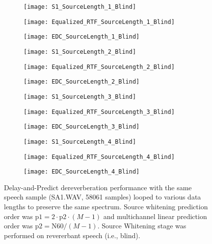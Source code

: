 \begin{figure}[H]
	\centering
	\begin{subfigure}[b]{0.3\textwidth}
		\centering
		\texttt{[image: S1\_SourceLength\_1\_Blind]}
	\end{subfigure}
	\begin{subfigure}[b]{0.3\textwidth}
		\centering
		\texttt{[image: Equalized\_RTF\_SourceLength\_1\_Blind]}
	\end{subfigure}
	\begin{subfigure}[b]{0.3\textwidth}
		\centering
		\texttt{[image: EDC\_SourceLength\_1\_Blind]}
	\end{subfigure}
	\begin{subfigure}[b]{0.3\textwidth}
		\centering
		\texttt{[image: S1\_SourceLength\_2\_Blind]}
	\end{subfigure}
	\begin{subfigure}[b]{0.3\textwidth}
		\centering
		\texttt{[image: Equalized\_RTF\_SourceLength\_2\_Blind]}
	\end{subfigure}
	\begin{subfigure}[b]{0.3\textwidth}
		\centering
		\texttt{[image: EDC\_SourceLength\_2\_Blind]}
	\end{subfigure}
	\begin{subfigure}[b]{0.3\textwidth}
		\centering
		\texttt{[image: S1\_SourceLength\_3\_Blind]}
	\end{subfigure}
	\begin{subfigure}[b]{0.3\textwidth}
		\centering
		\texttt{[image: Equalized\_RTF\_SourceLength\_3\_Blind]}
	\end{subfigure}
	\begin{subfigure}[b]{0.3\textwidth}
		\centering
		\texttt{[image: EDC\_SourceLength\_3\_Blind]}
	\end{subfigure}
	\begin{subfigure}[b]{0.3\textwidth}
		\centering
		\texttt{[image: S1\_SourceLength\_4\_Blind]}
	\end{subfigure}
	\begin{subfigure}[b]{0.3\textwidth}
		\centering
		\texttt{[image: Equalized\_RTF\_SourceLength\_4\_Blind]}
	\end{subfigure}
	\begin{subfigure}[b]{0.3\textwidth}
		\centering
		\texttt{[image: EDC\_SourceLength\_4\_Blind]}
	\end{subfigure}
	\caption{Delay-and-Predict dereverberation performance with the same speech sample (SA1.WAV, 58061 samples) looped to various data lengths to preserve the same spectrum. Source whitening prediction order was $\mathrm{p1} = 2 \cdot \mathrm{p2} \cdot (M-1)$ and multichannel linear prediction order was $\mathrm{p2} = \mathrm{N60} / (M-1)$. Source Whitening stage was performed on revererbant speech (i.e., blind).}
	\label{fig:params_source_length_compare}
\end{figure}

